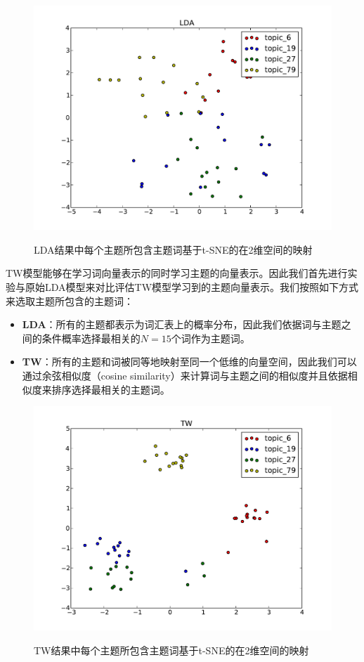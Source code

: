 \documentclass[master]{njuthesis}
\begin{document}
\begin{figure}[htbp]
  \centering
  \includegraphics[width= 1.0\textwidth]{figures//lda_tsne_chap4.pdf}\\
  \caption{LDA结果中每个主题所包含主题词基于t-SNE的在2维空间的映射}\label{fig:lda_tsne_chap4}
\end{figure}

TW模型能够在学习词向量表示的同时学习主题的向量表示。因此我们首先进行实验与原始LDA\cite{blei2003latent}模型来对比评估TW模型学习到的主题向量表示。我们按照如下方式来选取主题所包含的主题词：

	\begin{itemize}
	\item \textbf{LDA}：所有的主题都表示为词汇表上的概率分布，因此我们依据词与主题之间的条件概率选择最相关的$N=15$个词作为主题词。
	\item \textbf{TW}：所有的主题和词被同等地映射至同一个低维的向量空间，因此我们可以通过余弦相似度（cosine similarity）来计算词与主题之间的相似度并且依据相似度来排序选择最相关的主题词。
	\end{itemize}
	
\begin{figure}[htbp]
\centering
\includegraphics[width= 1.0\textwidth]{figures//tw_tsne_chap4.pdf}\\
\caption{TW结果中每个主题所包含主题词基于t-SNE的在2维空间的映射}\label{fig:tw_tsne_chap4}
\end{figure}
	
\end{document}
